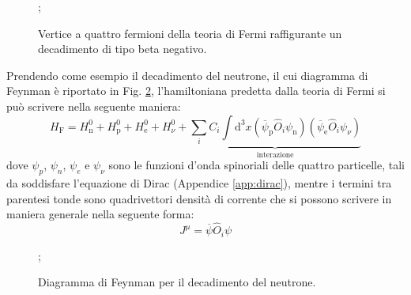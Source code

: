 \documentclass{subnucbo}
\begin{document}
\begin{figure}[!h]
        \centering
        ;
        \caption{Vertice a quattro fermioni della teoria di Fermi raffigurante un decadimento di tipo beta negativo.}
        \label{fig:fermi_decay}
\end{figure}
Prendendo come esempio il decadimento del neutrone, il cui diagramma di Feynman è riportato in Fig. \ref{fig:neutron_decay_simple}, l'hamiltoniana predetta dalla teoria di Fermi si può scrivere nella seguente maniera:
\begin{equation}
        H _ { \mathrm { F } } = H _ { \mathrm { n } } ^ { 0 } + H _ { \mathrm { p } } ^ { 0 } + H _ { \mathrm { e } } ^ { 0 } + H _ { \nu } ^ { 0 } + \underbrace { \sum _ { i } C _ { i } \int \mathrm { d } ^ { 3 } x \left( \overline { \psi } _ { \mathrm { p } } \hat { O } _ { i } \psi _ { \mathrm { n } } \right) \left( \overline { \psi } _ { \mathrm { e } } \hat { O } _ { i } \psi _ { \nu } \right) } _ { \text { interazione } }
        \label{eq:fermi_hamiltonian}
\end{equation}
dove $\psi_{p}$, $\psi_{n}$, $\psi_{e}$ e $\psi_{\nu}$ sono le funzioni d'onda spinoriali delle quattro particelle, tali da soddisfare l'equazione di Dirac (Appendice \ref{app:dirac}), mentre i termini tra parentesi tonde sono quadrivettori densità di corrente che si possono scrivere in maniera generale nella seguente forma:
\begin{equation}
        J ^ { \mu } = \overline { \psi } \hat{O} _ { i } \psi
        \label{eq:current}
\end{equation}
\begin{figure}[!h]
        \centering
        ;
        \caption{Diagramma di Feynman per il decadimento del neutrone.}
        \label{fig:neutron_decay_simple}
\end{figure}
\end{document}
